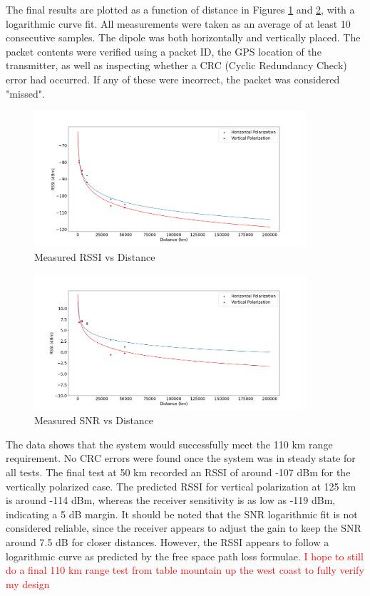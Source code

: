 The final results are plotted as a function of distance in Figures \ref{fig:rangeRssi} and \ref{fig:rangeSnr}, with a logarithmic curve fit. All measurements were taken as an average of at least 10 consecutive samples. The dipole was both horizontally and vertically placed. The packet contents were verified using a packet ID, the GPS location of the transmitter, as well as inspecting whether a CRC (Cyclic Redundancy Check) error had occurred. If any of these were incorrect, the packet was considered "missed".

\begin{figure}[!htb]
  \centering
  \includegraphics[width=0.9\textwidth]{rangeRssi}
  \caption{Measured RSSI vs Distance}
  \label{fig:rangeRssi}
\end{figure}

\begin{figure}[!htb]
  \centering
  \includegraphics[width=0.9\textwidth]{rangeSnr}
  \caption{Measured SNR vs Distance}
  \label{fig:rangeSnr}
\end{figure}

The data shows that the system would successfully meet the 110 km range requirement. No CRC errors were found once the system was in steady state for all tests. The final test at 50 km recorded an RSSI of around -107 dBm for the vertically polarized case. The predicted RSSI for vertical polarization at 125 km is around -114 dBm, whereas the receiver sensitivity is as low as -119 dBm, indicating a 5 dB margin. It should be noted that the SNR logarithmic fit is not considered reliable, since the receiver appears to adjust the gain to keep the SNR around 7.5 dB for closer distances. However, the RSSI appears to follow a logarithmic curve as predicted by the free space path loss formulae. \textcolor{red}{I hope to still do a final 110 km range test from table mountain up the west coast to fully verify my design}